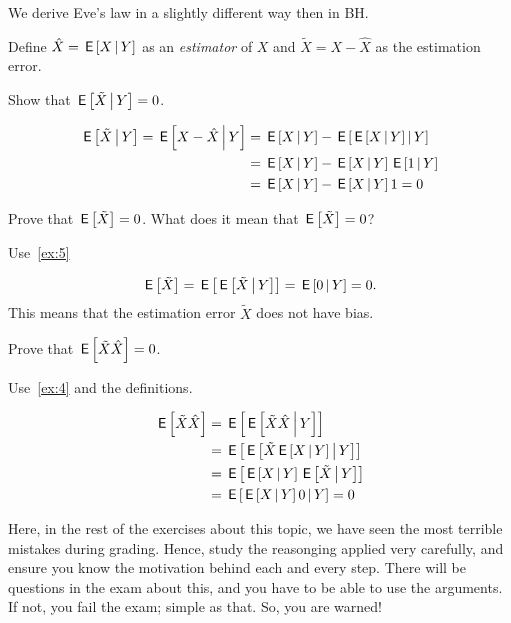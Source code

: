 \documentclass[assignments]{subfiles}
\begin{document}
We derive Eve's law in a slightly different way then in BH.

Define $\hat X = \,\mathsf{E}\left[X\,\middle|\, Y\right]$ as an \emph{estimator} of $X$ and $\tilde X = X - \hat X$ as the estimation error.

\begin{exercise}\label{ex:5}
Show that $\,\mathsf{E}\left[\tilde X\,\middle|\, Y\right] = 0$.
\begin{solution}
\begin{align}
\label{eq:4}
\,\mathsf{E}\left[\tilde X \,\middle|\, Y\right] = \,\mathsf{E}\left[X - \hat X \,\middle|\, Y\right] &=
\,\mathsf{E}\left[X\,\middle|\, Y\right]  - \,\mathsf{E}\left[ \,\mathsf{E}\left[X\,\middle|\, Y\right]\,\middle|\, Y\right]  \\
&=\,\mathsf{E}\left[X\,\middle|\, Y\right]  -  \,\mathsf{E}\left[X\,\middle|\, Y\right]\,\mathsf{E}\left[1\,\middle|\, Y\right]  \\
&=\,\mathsf{E}\left[X\,\middle|\, Y\right]  -  \,\mathsf{E}\left[X\,\middle|\, Y\right]1 = 0
\end{align}
\end{solution}
\end{exercise}

\begin{exercise}\label{ex:4}
Prove that $\,\mathsf{E}\left[\tilde X\right] = 0$. What does it mean that $\,\mathsf{E}\left[\tilde X\right] =0$?
\begin{hint}
  Use~\cref{ex:5}
\end{hint}
\begin{solution}
\begin{equation}
\label{eq:5}
\,\mathsf{E}\left[\tilde X\right] = \,\mathsf{E}\left[\,\mathsf{E}\left[\tilde X\,\middle|\, Y\right]\right] = \,\mathsf{E}\left[ 0 \,\middle|\, Y\right] =0.
\end{equation}
This means that the estimation error $\tilde X$ does not have bias.
\end{solution}
\end{exercise}

\begin{exercise}
Prove that $\,\mathsf{E}\left[\tilde X\hat X\right] = 0$.
\begin{hint}
  Use~\cref{ex:4} and the definitions.
\end{hint}
\begin{solution}
\begin{align}
\label{eq:6}
\,\mathsf{E}\left[\tilde X\hat X\right] &= \,\mathsf{E}\left[\,\mathsf{E}\left[\tilde X \hat X \,\middle|\, Y\right]\right]  \\
&= \,\mathsf{E}\left[\,\mathsf{E}\left[\tilde X \,\mathsf{E}\left[X\,\middle|\, Y\right] \,\middle|\, Y\right]\right]  \\
&= \,\mathsf{E}\left[\,\mathsf{E}\left[X\,\middle|\, Y\right]\,\mathsf{E}\left[\tilde X \,\middle|\, Y\right]\right]  \\
&= \,\mathsf{E}\left[\,\mathsf{E}\left[X\,\middle|\, Y\right] 0  \,\middle|\, Y\right]  = 0
\end{align}

Here, in the rest of the exercises about this topic, we have seen the most terrible mistakes during grading.
Hence, study the reasonging applied very carefully, and ensure you know the motivation behind each and every step.
There will be questions in the exam about this, and you have to be able to use the arguments. If not, you fail the exam; simple as that. So, you are warned!
\end{solution}
\end{exercise}
\end{document}
